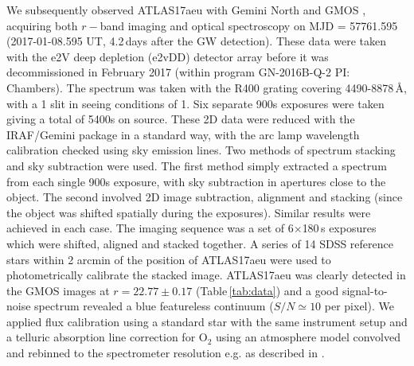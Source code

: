 \documentclass[twocolumn]{aastex61}
\begin{document}
We subsequently observed ATLAS17aeu with Gemini North and GMOS \citep{2004PASP..116..425H}, acquiring both $r-$band imaging and optical spectroscopy on MJD = 57761.595 (2017-01-08.595 UT, 4.2\,days after the GW detection). 
These data were taken with the e2V deep depletion (e2vDD) detector array before it was 
decommissioned in February 2017 (within program GN-2016B-Q-2 PI: Chambers). 
The spectrum was taken with the R400 grating covering 4490-8878\,\AA, with a 1 slit in seeing conditions of 1. Six separate 900s exposures were taken giving a total of 5400s on source. These 2D data were reduced with the IRAF/Gemini package in a 
standard way, with the arc lamp wavelength calibration checked  using sky emission lines.  
 Two methods of spectrum stacking and sky subtraction were used. The first method simply extracted a spectrum from each
single 900s exposure, with sky subtraction in apertures close to the object. The 
second involved 2D image subtraction, alignment and stacking (since the object
was shifted spatially during the exposures). Similar results were achieved in each case.
The imaging sequence was a set of 6$\times$180\,s exposures which were shifted, aligned 
and stacked together. A series of 14 SDSS reference stars within 2 arcmin of the position of ATLAS17aeu were used to photometrically calibrate the stacked image. ATLAS17aeu was clearly detected in the
GMOS images at 
$r=22.77\pm0.17$ (Table\,\ref{tab:data}) and a good signal-to-noise spectrum 
revealed a blue featureless continuum ($S/N\simeq  10$ per pixel).  We applied flux calibration using a standard star with 
the same instrument setup and a telluric absorption 
line correction for O$_2$ using an atmosphere model 
convolved and rebinned to the spectrometer resolution e.g. as described in \cite{2015A&A...579A..40S}. 
\end{document}
